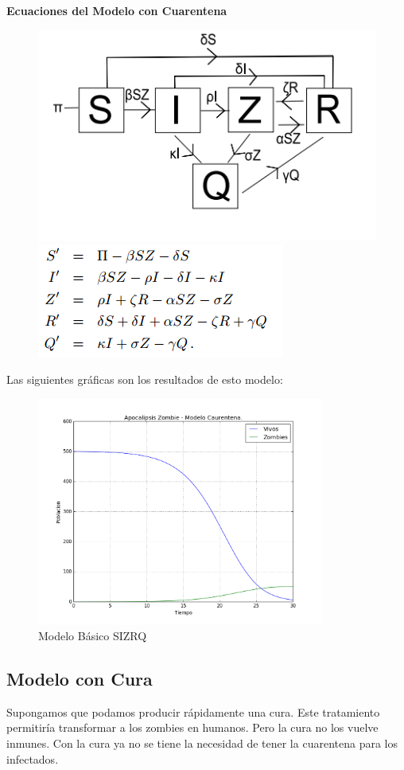 \documentclass[12pt]{article}
\begin{document}
\textbf{Ecuaciones del Modelo con Cuarentena}
\begin{figure}[H]
\centering
\includegraphics[scale=0.45]{QModeloG.png}
\hspace{0.5cm}
\includegraphics[scale=0.65]{QModelo.png}
\end{figure}

Las siguientes gráficas son los resultados de esto modelo:
\begin{figure}[H]
\centering
\includegraphics[height=7.5cm]{Cuarentena.png}
\caption{Modelo Básico SIZRQ}
\end{figure} 
\pagebreak

\subsection{Modelo con Cura}
Supongamos que podamos producir rápidamente una cura. Este tratamiento permitiría transformar a los zombies en humanos. Pero la cura no los vuelve inmunes. Con la cura ya no se tiene la necesidad de tener la cuarentena para los infectados.
\end{document}
